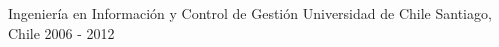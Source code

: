 \pagebreak
{}


\begin{cventries}

  \cventry
    {Ingeniería en Información y Control de Gestión} %
    {Universidad de Chile} %
    {Santiago, Chile} %
    {2006 - 2012} %
    {}


\end{cventries}
